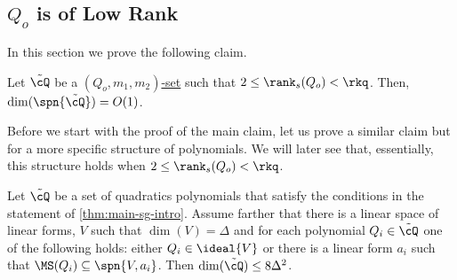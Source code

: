 \subsection{$Q_o$ is of Low Rank}
















In this section we prove the following claim.

\begin{claim}\label{cla:strong-Q-dom-lr-main}
Let $\tilde{\cQ}$ be a \hyperref[def:Q-dom]{$(Q_o,m_1,m_2)$-set} such that $2\leq \rank_s(Q_o)< \rkq$.
Then, $\dim(\spn{\tilde{\cQ}}) = O(1)$.
\end{claim}

Before we start with the proof of the main claim, let us prove a similar claim but for a more specific structure of polynomials. We will later see that, essentially, this structure holds when $2\leq \rank_s(Q_o)< \rkq$.

\begin{claim}\label{cla:V-li}
	Let $\tilde{\cQ}$ be a set of quadratics polynomials that satisfy the conditions in the statement of \autoref{thm:main-sg-intro}. Assume farther that there is a linear space of linear forms, $V$ such that $\dim(V)=\Delta$ and for each polynomial $Q_i \in \tilde{\cQ}$ one of the following holds: either $Q_i \in \ideal{V}$ or there is a linear form $a_i$ such that $\MS(Q_i) \subseteq \spn{V,a_i}$. Then $\dim(\tilde{\cQ}) \leq 8\Delta^2 $.
\end{claim}


